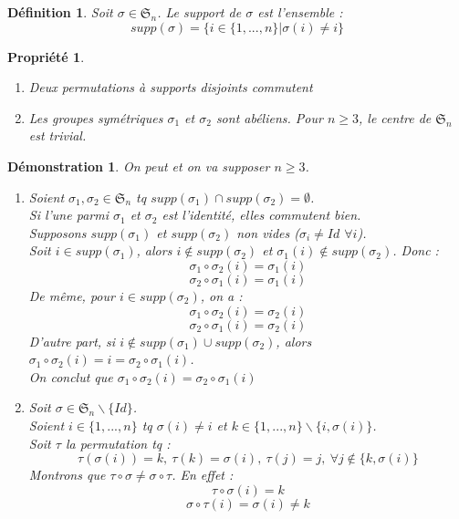 \documentclass[a4paper, oneside]{report}
\theoremstyle{break}
\newtheorem{defi}[thm]{Définition}
\newtheorem{propr}[thm]{Propriété}
\newtheorem*{demo}{Démonstration}
\renewcommand{\S}{\mathfrak{S}}
\begin{document}
\begin{defi}
	Soit $\sigma \in \S_n$. Le support de $\sigma$ est l'ensemble :
	$$supp(\sigma)=\{i\in \{1,...,n \} | \sigma(i)\neq i \}$$
\end{defi}

\begin{propr}
	\begin{enumerate}
		\item Deux permutations à supports disjoints commutent
		\item Les groupes symétriques $\sigma_1$ et $\sigma_2$ sont abéliens. Pour $n\geq 3$, le centre de $\S_n$ est trivial.
	\end{enumerate}	
\end{propr}

\begin{demo}
	On peut et on va supposer $n\geq 3$.
	\begin{enumerate}
		\item Soient $\sigma_1,\sigma_2 \in \S_n$ tq $supp(\sigma_1)\cap supp(\sigma_2) = \emptyset$.\\
		Si l'une parmi $\sigma_1$ et $\sigma_2$ est l'identité, elles commutent bien.\\
		Supposons $supp(\sigma_1)$ et $supp(\sigma_2)$ non vides ($\sigma_i \neq Id$ $\forall i$).\\
		Soit $i\in supp(\sigma_1)$, alors $i\notin supp(\sigma_2)$ et $\sigma_1(i)\notin supp(\sigma_2)$. Donc :
		$$\sigma_1 \circ \sigma_2(i)=\sigma_1(i)$$
		$$\sigma_2 \circ \sigma_1(i)=\sigma_1(i)$$
		De même, pour $i\in supp(\sigma_2)$, on a :
		$$\sigma_1 \circ \sigma_2(i)=\sigma_2(i)$$
		$$\sigma_2 \circ \sigma_1(i)=\sigma_2(i)$$
		D'autre part, si $i\notin supp(\sigma_1)\cup supp(\sigma_2)$, alors $\sigma_1 \circ \sigma_2(i) = i = \sigma_2 \circ \sigma_1(i)$.\\
		On conclut que $\sigma_1 \circ \sigma_2(i)= \sigma_2 \circ \sigma_1(i)$
		
		\item Soit $\sigma \in \S_n \backslash \{Id\}$.\\
		Soient $i\in \{1,...,n\}$ tq $\sigma(i)\neq i$ et $k\in \{1,...,n\}\backslash \{i, \sigma(i) \}$.\\
		Soit $\tau$ la permutation tq :
		$$\tau(\sigma (i))=k,~\tau(k)=\sigma(i),~\tau(j)=j,~\forall j\notin \{k,\sigma(i) \}$$
		Montrons que $\tau \circ \sigma \neq \sigma \circ \tau$. En effet :
		$$\tau \circ \sigma (i) = k$$
		$$\sigma \circ \tau (i) = \sigma(i) \neq k$$
	\end{enumerate}
~
\end{demo}
\end{document}
